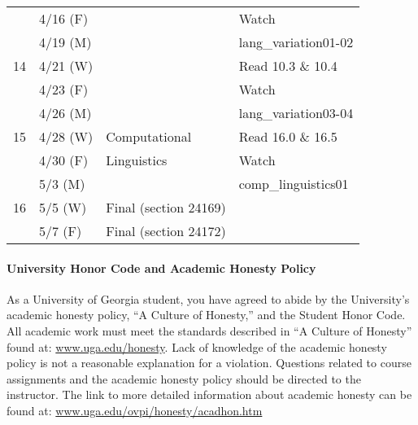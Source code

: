\documentclass{article}
\begin{document}
\begin{longtable}{c l l | l}
            & 4/16 (F)    &                                 & Watch\\
            & 4/19 (M)    &                                 & lang\_variation01-02\\
      \hline
      14    & 4/21 (W)    &                                 & Read 10.3 \& 10.4\\
            & 4/23 (F)    &                                 & Watch\\
            & 4/26 (M)    &                                 & lang\_variation03-04\\
      \hline
      15    & 4/28 (W)    & Computational                   & Read 16.0 \& 16.5\\
            & 4/30 (F)    & Linguistics                     & Watch\\
            & 5/3  (M)    &                                 & comp\_linguistics01\\
      \hline
      16    & 5/5  (W)    & Final (section 24169)           & \\
            & 5/7  (F)    & Final (section 24172)           &
    \end{longtable}

  \paragraph{University Honor Code and Academic Honesty Policy}
    As a University of Georgia student, you have agreed to abide by the University’s academic honesty policy, ``A Culture of Honesty,'' and the Student Honor Code. All academic work must meet the standards described in ``A Culture of Honesty'' found at: \url{www.uga.edu/honesty}. Lack of knowledge of the academic honesty policy is not a reasonable explanation for a violation. Questions related to course assignments and the academic honesty policy should be directed to the instructor. The link to more detailed information about academic honesty can be found at: \url{www.uga.edu/ovpi/honesty/acadhon.htm}
\end{document}
